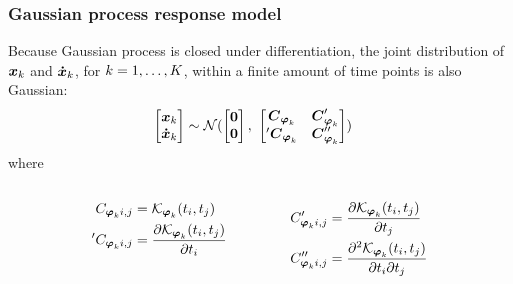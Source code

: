 \begin{frame}[t]
    \frametitle{Gaussian process response model}
    Because Gaussian process is closed under differentiation, the joint distribution of $\boldsymbol{x}_{k}$ and $\boldsymbol{\dot{x}}_{k}$, for $k = 1,\dots,K$, within a finite amount of time points is also Gaussian:
    \begin{align}
        \begin{bmatrix}
            \dymxk{k}
            \\ 
            \dymdxk{k}
        \end{bmatrix}
        & \sim 
        \mathcal{N}(
            \begin{bmatrix}
                \mvector{0} 
               \\ 
                \mvector{0}
            \end{bmatrix}
            ,\ 
            \begin{bmatrix}
                \dymCphik{k} & \dymCdphik{k}
                \\ 
                \dymdCphik{k} & \dymdCdphik{k}
            \end{bmatrix}
        )
    \end{align}
    where
    \begin{columns}
        \begin{column}{0.15\textwidth}            
        \end{column}
        \begin{column}{0.35\textwidth}
            \begin{align}
                C_{\boldsymbol{\varphi}_{k}i, j} 
                & = \mathcal{K}_{\boldsymbol{\varphi}_{k}}(t_{i}, t_{j})
                \nonumber    
                \\
                {}^{\prime}C_{\boldsymbol{\varphi}_{k}i, j} 
                & = \frac{\partial\mathcal{K}_{\boldsymbol{\varphi}_{k}}(t_{i}, t_{j})}
                {\partial t_{i}}
                \nonumber            
            \end{align}
        \end{column}
        \begin{column}{0.35\textwidth}    
            \begin{align}
                C^{\prime}_{\boldsymbol{\varphi}_{k}i, j} 
                & = \frac{\partial\mathcal{K}_{\boldsymbol{\varphi}_{k}}(t_{i}, t_{j})}
                {\partial t_{j}}
                \nonumber
                \\
                C^{\prime\prime}_{\boldsymbol{\varphi}_{k}i, j} 
                & = \frac{\partial^2\mathcal{K}_{\boldsymbol{\varphi}_{k}}(t_{i}, t_{j})}
                {\partial t_{i}\partial t_{j}}
                \nonumber
            \end{align}
        \end{column}
        \begin{column}{0.15\textwidth}            
        \end{column}
    \end{columns}     
\end{frame}

